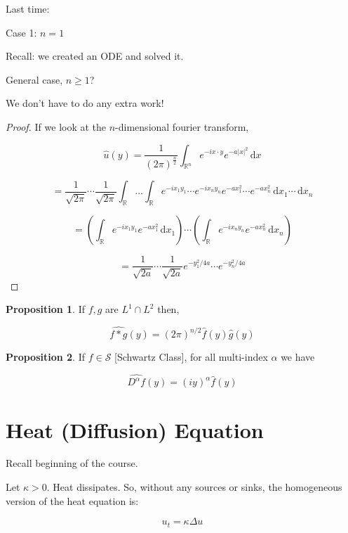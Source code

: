 \documentclass{article}
\theoremstyle{definition}
\newtheorem{proposition}{Proposition}
\begin{document}
Last time:

Case 1: \(n = 1\) 

Recall: we created an ODE and solved it.

General case, \(n \geq 1\)?

We don't have to do any extra work!

\begin{proof}

If we look at the \(n\)-dimensional fourier transform,

\[
    \hat{u}(y) = \frac{1}{(2\pi)^{\frac{n}{2}}}\int_{\mathbb{R} ^n}^{} e^{-ix\cdot y}e^{-a \vert x \vert ^2} \,\mathrm{d}x 
\]

\[
    = \frac{1}{\sqrt{2\pi }}\cdots \frac{1}{\sqrt{2\pi } }\int_{\mathbb{R} }^{} \dots \int_{\mathbb{R} }^{} e^{-i x_1 y_1}\cdots e^{-i x_n y_n}e^{-a x_1^2}\cdots e^{-ax_n^2} \,\mathrm{d}x_1 \cdots \,\mathrm{d}x_n 
\]

\[
    = \left( \int_{\mathbb{R}}^{} e^{-ix_1 y_1}e^{-ax_1^2} \,\mathrm{d}x_1  \right) \cdots
    \left( \int_{\mathbb{R}}^{} e^{-ix_n y_n}e^{-ax_n^2} \,\mathrm{d}x_n  \right)
\]

\[
    = \frac{1}{\sqrt{2a}}\cdots \frac{1}{\sqrt{2a}} e^{-y_1^2 / 4a}\cdots e^{-y_n^2 / 4a}
\]

\end{proof}

\begin{proposition}
    If \(f,g\) are \(L^1\cap L^2\) then,

    \[
        \widehat{f * g}(y) = (2\pi)^{n / 2}\widehat f(y) \widehat g(y)
    \]
\end{proposition}

\begin{proposition}
    If \(f\in \mathcal{S} \) [Schwartz Class], for all multi-index \(\alpha\) we have

    \[
        \widehat{D^\alpha f}(y) = (iy)^\alpha \widehat{f}(y)
    \]
\end{proposition}

\section*{Heat (Diffusion) Equation}

Recall beginning of the course.

Let \(\kappa > 0\). Heat dissipates. So, without any sources or sinks, the homogeneous version of the heat equation is:

\[
    u_t = \kappa \Delta u
\]
\end{document}
